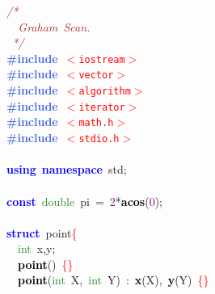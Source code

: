 
{\ttfamily \raggedright {
\noindent
\mbox{}\textit{\textcolor{Brown}{/*}} \\
\mbox{}\textit{\textcolor{Brown}{\ \ Graham\ Scan.}} \\
\mbox{}\textit{\textcolor{Brown}{\ */}} \\
\mbox{}\textbf{\textcolor{RoyalBlue}{\#include}}\ \texttt{\textcolor{Red}{$<$iostream$>$}} \\
\mbox{}\textbf{\textcolor{RoyalBlue}{\#include}}\ \texttt{\textcolor{Red}{$<$vector$>$}} \\
\mbox{}\textbf{\textcolor{RoyalBlue}{\#include}}\ \texttt{\textcolor{Red}{$<$algorithm$>$}} \\
\mbox{}\textbf{\textcolor{RoyalBlue}{\#include}}\ \texttt{\textcolor{Red}{$<$iterator$>$}} \\
\mbox{}\textbf{\textcolor{RoyalBlue}{\#include}}\ \texttt{\textcolor{Red}{$<$math.h$>$}} \\
\mbox{}\textbf{\textcolor{RoyalBlue}{\#include}}\ \texttt{\textcolor{Red}{$<$stdio.h$>$}} \\
\mbox{} \\
\mbox{}\textbf{\textcolor{Blue}{using}}\ \textbf{\textcolor{Blue}{namespace}}\ std\textcolor{BrickRed}{;} \\
\mbox{} \\
\mbox{}\textbf{\textcolor{Blue}{const}}\ \textcolor{ForestGreen}{double}\ pi\ \textcolor{BrickRed}{=}\ \textcolor{Purple}{2}\textcolor{BrickRed}{*}\textbf{\textcolor{Black}{acos}}\textcolor{BrickRed}{(}\textcolor{Purple}{0}\textcolor{BrickRed}{);} \\
\mbox{} \\
\mbox{}\textbf{\textcolor{Blue}{struct}}\ point\textcolor{Red}{\{} \\
\mbox{}\ \ \textcolor{ForestGreen}{int}\ x\textcolor{BrickRed}{,}y\textcolor{BrickRed}{;} \\
\mbox{}\ \ \textbf{\textcolor{Black}{point}}\textcolor{BrickRed}{()}\ \textcolor{Red}{\{\}} \\
\mbox{}\ \ \textbf{\textcolor{Black}{point}}\textcolor{BrickRed}{(}\textcolor{ForestGreen}{int}\ X\textcolor{BrickRed}{,}\ \textcolor{ForestGreen}{int}\ Y\textcolor{BrickRed}{)}\ \textcolor{BrickRed}{:}\ \textbf{\textcolor{Black}{x}}\textcolor{BrickRed}{(}X\textcolor{BrickRed}{),}\ \textbf{\textcolor{Black}{y}}\textcolor{BrickRed}{(}Y\textcolor{BrickRed}{)}\ \textcolor{Red}{\{\}} \\
}}
